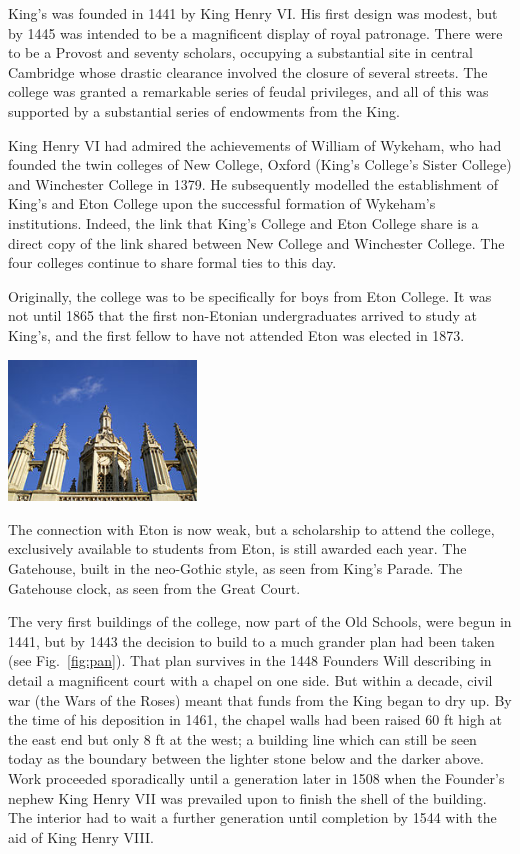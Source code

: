 King's was founded in 1441 by King Henry VI. His first design was modest, but by 1445 was intended to be a magnificent display of royal patronage. There were to be a Provost and seventy scholars, occupying a substantial site in central Cambridge whose drastic clearance involved the closure of several streets. The college was granted a remarkable series of feudal privileges, and all of this was supported by a substantial series of endowments from the King.

King Henry VI had admired the achievements of William of Wykeham, who had founded the twin colleges of New College, Oxford (King's College's Sister College) and Winchester College in 1379. He subsequently modelled the establishment of King's and Eton College upon the successful formation of Wykeham's institutions. Indeed, the link that King's College and Eton College share is a direct copy of the link shared between New College and Winchester College. The four colleges continue to share formal ties to this day.

Originally, the college was to be specifically for boys from Eton College. It was not until 1865 that the first non-Etonian undergraduates arrived to study at King's, and the first fellow to have not attended Eton was elected in 1873. \\


\parbox{5cm}{ \includegraphics[width=5cm]{Chapter2/Figures/clock.jpg}\\}\hspace{0.2cm} 
\parbox{7cm}{The connection with Eton is now weak, but a scholarship to attend the college, exclusively available to students from Eton, is still awarded each year. The Gatehouse, built in the neo-Gothic style, as seen from King's Parade. The Gatehouse clock, as seen from the Great Court. \\}


The very first buildings of the college, now part of the Old Schools, were begun in 1441, but by 1443 the decision to build to a much grander plan had been taken (see Fig.~\ref{fig:pan}). That plan survives in the 1448 Founders Will describing in detail a magnificent court with a chapel on one side. But within a decade, civil war (the Wars of the Roses) meant that funds from the King began to dry up. By the time of his deposition in 1461, the chapel walls had been raised 60 ft high at the east end but only 8 ft at the west; a building line which can still be seen today as the boundary between the lighter stone below and the darker above. Work proceeded sporadically until a generation later in 1508 when the Founder's nephew King Henry VII was prevailed upon to finish the shell of the building. The interior had to wait a further generation until completion by 1544 with the aid of King Henry VIII.

